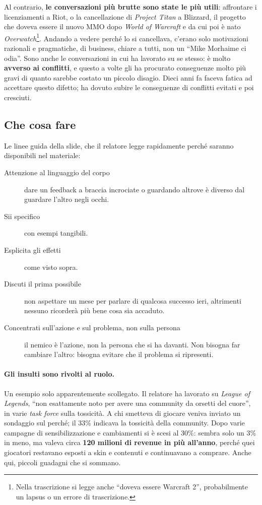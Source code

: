 Al contrario, \textbf{le conversazioni più brutte sono state le più utili}:
affrontare i licenziamenti a Riot, o la cancellazione di \emph{Project Titan}
a Blizzard, il progetto che doveva essere il nuovo MMO dopo \emph{World of
Warcraft} e da cui poi è nato \emph{Overwatch}\footnote{Nella trascrizione si
legge anche ``doveva essere Warcraft 2'', probabilmente un lapsus o un errore
di trascrizione.}. Andando a vedere perché lo si cancellava, c'erano solo
motivazioni razionali e pragmatiche, di business, chiare a tutti, non un ``Mike
Morhaime ci odia''. Sono anche le conversazioni in cui ha lavorato su se
stesso: è molto \textbf{avverso ai conflitti}, e questo a volte gli ha
procurato conseguenze molto più gravi di quanto sarebbe costato un piccolo
disagio. Dieci anni fa faceva fatica ad accettare questo difetto; ha dovuto
subire le conseguenze di conflitti evitati e poi cresciuti.

\subsection{Che cosa fare}

Le linee guida della slide, che il relatore legge rapidamente perché saranno
disponibili nel materiale:
\begin{description}
  \item[Attenzione al linguaggio del corpo] dare un feedback a braccia
        incrociate o guardando altrove è diverso dal guardare l'altro negli
        occhi.
  \item[Sii specifico] con esempi tangibili.
  \item[Esplicita gli effetti] come visto sopra.
  \item[Discuti il prima possibile] non aspettare un mese per parlare di
        qualcosa successo ieri, altrimenti nessuno ricorderà più bene cosa sia
        accaduto.
  \item[Concentrati sull'azione e sul problema, non sulla persona] il nemico è
        l'azione, non la persona che si ha davanti. Non bisogna far cambiare
        l'altro: bisogna evitare che il problema si ripresenti.
\end{description}

\paragraph{Gli insulti sono rivolti al ruolo.} Un esempio solo apparentemente
scollegato. Il relatore ha lavorato su \emph{League of Legends}, ``non
esattamente noto per avere una community da orsetti del cuore'', in varie
\emph{task force} sulla tossicità. A chi smetteva di giocare veniva inviato un
sondaggio sul perché; il 33\% indicava la tossicità della community. Dopo varie
campagne di sensibilizzazione e cambiamenti si è scesi al 30\%: sembra solo
un 3\% in meno, ma valeva circa \textbf{120 milioni di revenue in più
all'anno}, perché quei giocatori restavano esposti a skin e contenuti e
continuavano a comprare. Anche qui, piccoli guadagni che si sommano.

